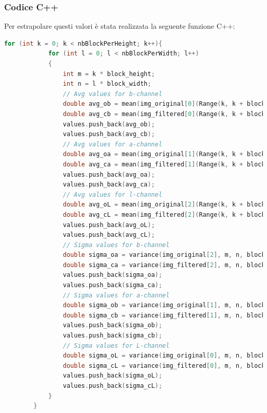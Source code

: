 \documentclass[a4paper,11pt]{article}
\begin{document}
    \subsubsection{Codice C++}
    Per estrapolare questi valori è stata realizzata la seguente funzione C++:
    \begin{lstlisting}[language=C++]
        for (int k = 0; k < nbBlockPerHeight; k++){
            for (int l = 0; l < nbBlockPerWidth; l++)
            {
                int m = k * block_height;
                int n = l * block_width;
                // Avg values for b-channel
                double avg_ob = mean(img_original[0](Range(k, k + block_height), Range(l, l + block_width)))[0];
                double avg_cb = mean(img_filtered[0](Range(k, k + block_height), Range(l, l + block_width)))[0];
                values.push_back(avg_ob);
                values.push_back(avg_cb);
                // Avg values for a-channel
                double avg_oa = mean(img_original[1](Range(k, k + block_height), Range(l, l + block_width)))[0];
                double avg_ca = mean(img_filtered[1](Range(k, k + block_height), Range(l, l + block_width)))[0];
                values.push_back(avg_oa);
                values.push_back(avg_ca);
                // Avg values for l-channel
                double avg_oL = mean(img_original[2](Range(k, k + block_height), Range(l, l + block_width)))[0];
                double avg_cL = mean(img_filtered[2](Range(k, k + block_height), Range(l, l + block_width)))[0];
                values.push_back(avg_oL);
                values.push_back(avg_cL);
                // Sigma values for b-channel
                double sigma_oa = variance(img_original[2], m, n, block_height, block_width);
                double sigma_ca = variance(img_filtered[2], m, n, block_height, block_width);
                values.push_back(sigma_oa);
                values.push_back(sigma_ca);
                // Sigma values for a-channel
                double sigma_ob = variance(img_original[1], m, n, block_height, block_width);
                double sigma_cb = variance(img_filtered[1], m, n, block_height, block_width);
                values.push_back(sigma_ob);
                values.push_back(sigma_cb);
                // Sigma values for L-channel
                double sigma_oL = variance(img_original[0], m, n, block_height, block_width);
                double sigma_cL = variance(img_filtered[0], m, n, block_height, block_width);
                values.push_back(sigma_oL);
                values.push_back(sigma_cL);
            }
        }
    \end{lstlisting}   
    
\end{document}
